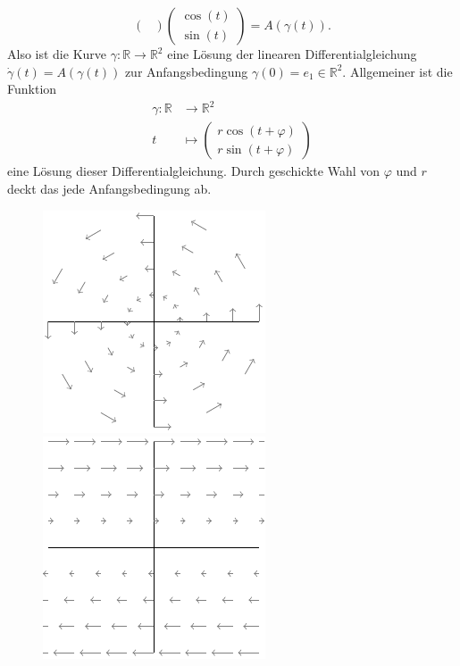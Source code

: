 \documentclass[../main.tex]{subfiles}
\begin{document}
\begin{examples}
\begin{enumerate}[(1)]
\[\begin{pmatrix}
        \end{pmatrix}
        \begin{pmatrix}
          \cos(t) \\ \sin(t)
        \end{pmatrix}
        = A(\gamma(t)).
      \]
      Also ist die Kurve $\gamma \colon \mathbb{R} \to \mathbb{R}^2$ 
      eine Lösung der linearen Differentialgleichung
      $\dot \gamma(t) = A(\gamma(t))$ 
      zur Anfangsbedingung $\gamma(0) = e_1 \in \mathbb{R}^2$.
      Allgemeiner ist die Funktion
      \begin{align*}
        \gamma \colon \mathbb{R} & \to \mathbb{R}^2 \\
        t & \mapsto 
        \begin{pmatrix}
          r \cos(t + \varphi) \\
          r \sin(t + \varphi)
        \end{pmatrix}
      \end{align*}
      eine Lösung dieser Differentialgleichung.
      Durch geschickte Wahl von $\varphi$ und $r$
      deckt das jede Anfangsbedingung ab.
      \begin{figure}[htb] 
        \centering
        \begin{minipage}{0.50\textwidth}
          \centering
          \includegraphics{figures/rotationfield}
        \end{minipage}%
        \begin{minipage}{0.50\textwidth}
          \centering
          \includegraphics{figures/yzero}

\end{minipage}
\end{figure}
\end{enumerate}
\end{examples}
\end{document}
